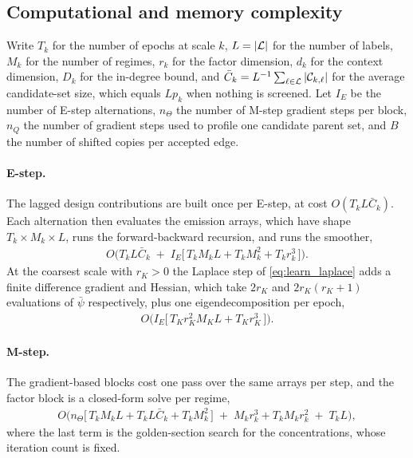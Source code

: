 \subsection{Computational and memory complexity}
\label{sec:learning:complexity}

Write $T_k$ for the number of epochs at scale $k$, $L = |{\mathcal{L}}|$ for the number of labels, $M_k$ for
the number of regimes, $r_k$ for the factor dimension, $d_k$ for the context dimension, $D_k$ for
the in-degree bound, and $\bar{C}_k = L^{-1}\sum_{\ell \in {\mathcal{L}}} |{\mathcal{C}}_{k,\ell}|$ for the average
candidate-set size, which equals $L p_k$ when nothing is screened. Let $I_E$ be the number of
E-step alternations, $n_\Theta$ the number of M-step gradient steps per block, $n_Q$ the number of
gradient steps used to profile one candidate parent set, and $B$ the number of shifted copies per
accepted edge.

\paragraph{E-step.}
The lagged design contributions are built once per E-step, at cost $O(T_k L \bar{C}_k)$. Each
alternation then evaluates the emission arrays, which have shape $T_k \times M_k \times L$, runs
the forward-backward recursion, and runs the smoother,
\begin{align}
O\!\Big(
T_k L \bar{C}_k
\;+\;
I_E \big[\, T_k M_k L + T_k M_k^2 + T_k r_k^3 \,\big]
\Big).
\label{eq:learn_cost_estep}
\end{align}
At the coarsest scale with $r_K > 0$ the Laplace step of \cref{eq:learn_laplace} adds a finite
difference gradient and Hessian, which take $2 r_K$ and $2 r_K (r_K + 1)$ evaluations of
$\bar{\psi}$ respectively, plus one eigendecomposition per epoch,
\begin{align}
O\!\Big(
I_E \big[\, T_K r_K^2 M_K L + T_K r_K^3 \,\big]
\Big).
\label{eq:learn_cost_laplace}
\end{align}

\paragraph{M-step.}
The gradient-based blocks cost one pass over the same arrays per step, and the factor block is a
closed-form solve per regime,
\begin{align}
O\!\Big(
n_\Theta \big[\, T_k M_k L + T_k L \bar{C}_k + T_k M_k^2 \,\big]
\;+\;
M_k r_k^3 + T_k M_k r_k^2
\;+\;
T_k L
\Big),
\label{eq:learn_cost_mstep}
\end{align}
where the last term is the golden-section search for the concentrations, whose iteration count is
fixed.


